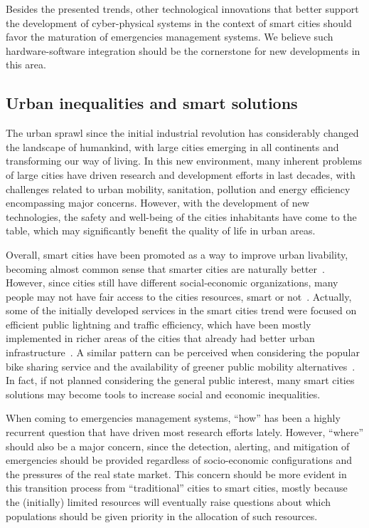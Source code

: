 \begin{refsection}
Besides the presented trends, other technological innovations that better support the development of cyber-physical systems in the context of smart cities should favor the maturation of emergencies management systems. We believe such hardware-software integration should be the cornerstone for new developments in this area.

\subsection{Urban inequalities and smart solutions}

The urban sprawl since the initial industrial revolution has considerably changed the landscape of humankind, with large cities emerging in all continents and transforming our way of living. In this new environment, many inherent problems of large cities have driven research and development efforts in last decades, with challenges related to urban mobility, sanitation, pollution and energy efficiency encompassing major concerns. However, with the development of new technologies, the safety and well-being of the cities inhabitants have come to the table, which may significantly benefit the quality of life in urban areas.

Overall, smart cities have been promoted as a way to improve urban livability, becoming almost common sense that smarter cities are naturally better~\cite{citylife}. However, since cities still have different social-economic organizations, many people may not have fair access to the cities resources, smart or not~\cite{inequalities1}. Actually, some of the initially developed services in the smart cities trend were focused on efficient public lightning and traffic efficiency, which have been mostly implemented in richer areas of the cities that already had better urban infrastructure~\cite{inequalities3}. A similar pattern can be perceived when considering the popular bike sharing service and the availability of greener public mobility alternatives~\cite{smartcycling}. In fact, if not planned considering the general public interest, many smart cities solutions may become tools to increase social and economic inequalities. 

When coming to emergencies management systems, ``how'' has been a highly recurrent question that have driven most research efforts lately. However, ``where'' should also be a major concern, since the detection, alerting, and mitigation of emergencies should be provided regardless of socio-economic configurations and the pressures of the real state market. This concern should be more evident in this transition process from ``traditional'' cities to smart cities, mostly because the (initially) limited resources will eventually raise questions about which populations should be given priority in the allocation of such resources. 


\end{refsection}
